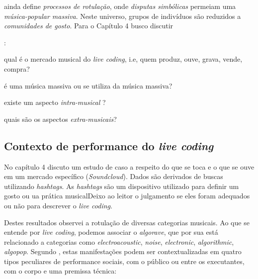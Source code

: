  ainda define \emph{processos de rotulação}, onde  \emph{disputas simbólicas} permeiam uma \emph{música-popular massiva}. Neste universo, grupos de indivíduos são reduzidos a \emph{comunidades de gosto}. Para o Capítulo 4 busco discutir \begin{inparaenum}:
\item qual é o mercado musical do \emph{live coding}, i.e, quem produz, ouve, grava, vende, compra?
\item é uma música massiva ou se utiliza da música massiva?
\item existe um aspecto \emph{intra-musical} ?
\item quais são os aspectos \emph{extra-musicais}?
\end{inparaenum}

\subsection{Contexto de performance do \emph{live coding}}\label{sec:contextualizacao_genero_livecoding}

No capítulo 4 discuto um estudo de caso a respeito do que se toca e o que se ouve em um mercado específico (\emph{Soundcloud}). Dados são derivados de buscas utilizando \emph{hashtags}. As \emph{hashtags} são um dispositivo utilizado para definir um gosto ou ua prática musicalDeixo ao leitor o julgamento se eles foram adequados ou não para descrever o \emph{live coding}.

Destes resultados observei a rotulação de diversas categorias musicais. Ao que se entende por \emph{live coding}, podemos associar o \emph{algorave}, que por sua está relacionado a categorias como  \emph{electroacoustic}, \emph{noise}, \emph{electronic}, \emph{algorithmic}, \emph{algopop}. Segundo , estas manifestações podem ser contextualizadas em quatro tipos peculiares de performance sociais, com o público ou entre os executantes, com o corpo e uma premissa técnica:

